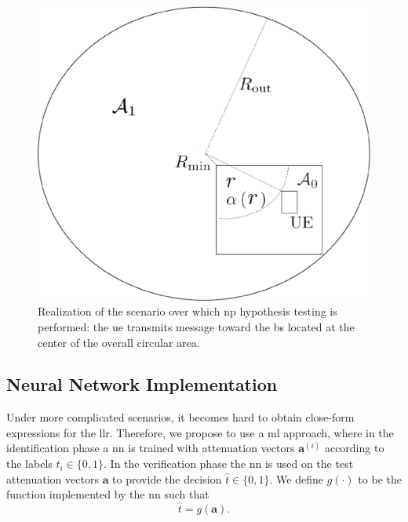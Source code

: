 \documentclass[conference,final]{IEEEtran}
\begin{document}
\begin{figure} 
    \centering
    \includegraphics[width=0.9\columnwidth]{simpleScen.eps}
    \caption{Realization of the scenario over which \ac{np} hypothesis testing is performed: the \ac{ue} transmits message toward the \ac{bs} located at the center of the overall circular area. }
    \label{fig:scen}
\end{figure}

\subsection{Neural Network Implementation}\label{sec:nn}

Under more complicated scenarios, it becomes hard to obtain close-form expressions for the \ac{llr}. Therefore, we propose to use a \ac{ml} approach, where in the identification phase a \ac{nn} is trained with attenuation vectors $\bm{a}^{(i)}$ according to the labels $t_i \in \{0,1\}$. In the verification phase the \ac{nn} is used on the test attenuation vectors $\bm a$ to provide the decision $\hat{t} \in \{0,1\}$. We define $g(\cdot)$ to be the function implemented by the \ac{nn} such that
 \begin{equation}
 	\hat{t} = g(\bm a).	
 \end{equation}
\end{document}
